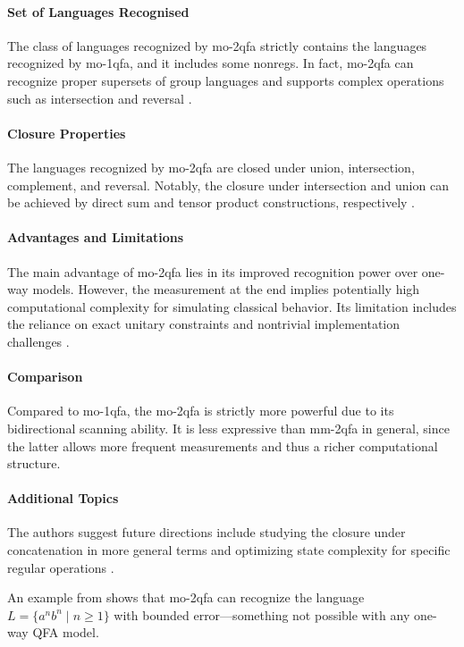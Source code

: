 \paragraph{Set of Languages Recognised} The class of languages recognized by \gls{mo-2qfa} strictly contains the languages recognized by \gls{mo-1qfa}, and it includes some non\glspl{reg}. In fact, \gls{mo-2qfa} can recognize proper supersets of group languages and supports complex operations such as intersection and reversal \cite{xi2008some}.

\paragraph{Closure Properties} The languages recognized by \gls{mo-2qfa} are closed under union, intersection, complement, and reversal. Notably, the closure under intersection and union can be achieved by direct sum and tensor product constructions, respectively \cite{xi2008some}.

\paragraph{Advantages and Limitations} The main advantage of \gls{mo-2qfa} lies in its improved recognition power over one-way models. However, the measurement at the end implies potentially high computational complexity for simulating classical behavior. Its limitation includes the reliance on exact unitary constraints and nontrivial implementation challenges \cite{xi2008some}.

\paragraph{Comparison} Compared to \gls{mo-1qfa}, the \gls{mo-2qfa} is strictly more powerful due to its bidirectional scanning ability. It is less expressive than \gls{mm-2qfa} in general, since the latter allows more frequent measurements and thus a richer computational structure.

\paragraph{Additional Topics} The authors suggest future directions include studying the closure under concatenation in more general terms and optimizing state complexity for specific regular operations \cite{xi2008some}.

\begin{example}
An example from \cite{xi2008some} shows that \gls{mo-2qfa} can recognize the language $L = \{ a^nb^n \mid n \geq 1 \}$ with bounded error—something not possible with any one-way QFA model.
\end{example}

